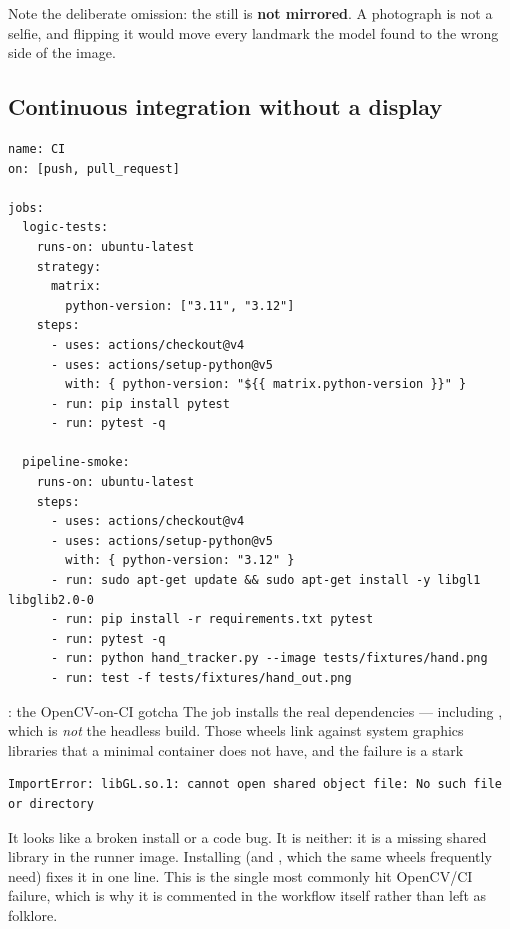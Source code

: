 Note the deliberate omission: the still is \textbf{not mirrored}. A photograph is not a selfie, and
flipping it would move every landmark the model found to the wrong side of the image.

\subsection{Continuous integration without a display}

\begin{codecard}
\begin{lstlisting}[style=codetextonly]
name: CI
on: [push, pull_request]

jobs:
  logic-tests:
    runs-on: ubuntu-latest
    strategy:
      matrix:
        python-version: ["3.11", "3.12"]
    steps:
      - uses: actions/checkout@v4
      - uses: actions/setup-python@v5
        with: { python-version: "${{ matrix.python-version }}" }
      - run: pip install pytest
      - run: pytest -q

  pipeline-smoke:
    runs-on: ubuntu-latest
    steps:
      - uses: actions/checkout@v4
      - uses: actions/setup-python@v5
        with: { python-version: "3.12" }
      - run: sudo apt-get update && sudo apt-get install -y libgl1 libglib2.0-0
      - run: pip install -r requirements.txt pytest
      - run: pytest -q
      - run: python hand_tracker.py --image tests/fixtures/hand.png
      - run: test -f tests/fixtures/hand_out.png
\end{lstlisting}
\end{codecard}

\begin{edgetrap}{: the OpenCV-on-CI gotcha}
The  job installs the real dependencies --- including
, which is \emph{not} the headless build. Those wheels link against
system graphics libraries that a minimal container does not have, and the failure is a stark

\begin{lstlisting}[style=codetextonly]
ImportError: libGL.so.1: cannot open shared object file: No such file or directory
\end{lstlisting}

It looks like a broken install or a code bug. It is neither: it is a missing shared library in the
runner image. Installing  (and , which the same wheels frequently
need) fixes it in one line. This is the single most commonly hit OpenCV/CI failure, which is why it
is commented in the workflow itself rather than left as folklore.
\end{edgetrap}

